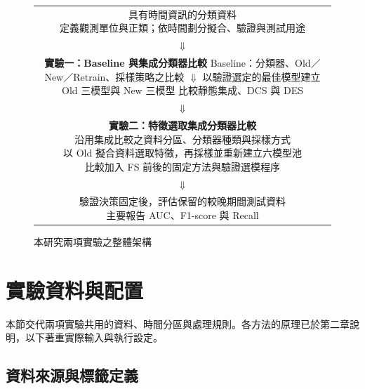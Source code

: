 \begin{figure}[htbp]
\centering
\begingroup
\small
{}
\setlength{\fboxsep}{8pt}
\begin{tabular}{@{}c@{}}
\fbox{\parbox{0.88\linewidth}{\centering 具有時間資訊的分類資料\\
定義觀測單位與正類；依時間劃分擬合、驗證與測試用途}}\\[3pt]
\(\Downarrow\)\\[3pt]
\fbox{\parbox{0.88\linewidth}{\centering\textbf{實驗一：Baseline 與集成分類器比較}\\[4pt]
Baseline：分類器、Old／New／Retrain、採樣策略之比較\\
\(\Downarrow\)\\
以驗證選定的最佳模型建立 Old 三模型與 New 三模型\\
比較靜態集成、DCS 與 DES}}\\[3pt]
\(\Downarrow\)\\[3pt]
\fbox{\parbox{0.88\linewidth}{\centering\textbf{實驗二：特徵選取集成分類器比較}\\[4pt]
沿用集成比較之資料分區、分類器種類與採樣方式\\
以 Old 擬合資料選取特徵，再採樣並重新建立六模型池\\
比較加入 FS 前後的固定方法與驗證選模程序}}\\[3pt]
\(\Downarrow\)\\[3pt]
\fbox{\parbox{0.88\linewidth}{\centering 驗證決策固定後，評估保留的較晚期間測試資料\\
主要報告 AUC、F1-score 與 Recall}}
\end{tabular}
\endgroup
\caption{本研究兩項實驗之整體架構}\label{fig:method-overview}
\par{}
\end{figure}

\clearpage

\section{實驗資料與配置}\label{sec:method-data}

本節交代兩項實驗共用的資料、時間分區與處理規則。各方法的原理已於第二章說明，以下著重實際輸入與執行設定。

\subsection{資料來源與標籤定義}\label{sec:method-label}

